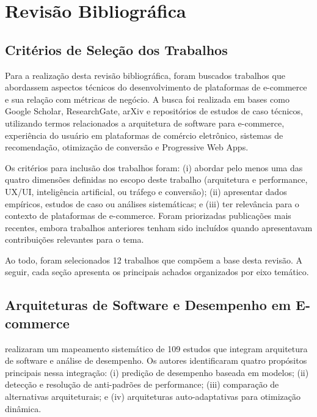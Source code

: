 \chapter{Revisão Bibliográfica}
\label{ch:revisao}

\section{Critérios de Seleção dos Trabalhos}

Para a realização desta revisão bibliográfica, foram buscados trabalhos que abordassem aspectos técnicos do desenvolvimento de plataformas de e-commerce e sua relação com métricas de negócio. A busca foi realizada em bases como Google Scholar, ResearchGate, arXiv e repositórios de estudos de caso técnicos, utilizando termos relacionados a arquitetura de software para e-commerce, experiência do usuário em plataformas de comércio eletrônico, sistemas de recomendação, otimização de conversão e Progressive Web Apps.

Os critérios para inclusão dos trabalhos foram: (i) abordar pelo menos uma das quatro dimensões definidas no escopo deste trabalho (arquitetura e performance, UX/UI, inteligência artificial, ou tráfego e conversão); (ii) apresentar dados empíricos, estudos de caso ou análises sistemáticas; e (iii) ter relevância para o contexto de plataformas de e-commerce. Foram priorizadas publicações mais recentes, embora trabalhos anteriores tenham sido incluídos quando apresentavam contribuições relevantes para o tema.

Ao todo, foram selecionados 12 trabalhos que compõem a base desta revisão. A seguir, cada seção apresenta os principais achados organizados por eixo temático.

\section{Arquiteturas de Software e Desempenho em E-commerce}

\cite{zhao_systematic_2024} realizaram um mapeamento sistemático de 109 estudos que integram arquitetura de software e análise de desempenho. Os autores identificaram quatro propósitos principais nessa integração: (i) predição de desempenho baseada em modelos; (ii) detecção e resolução de anti-padrões de performance; (iii) comparação de alternativas arquiteturais; e (iv) arquiteturas auto-adaptativas para otimização dinâmica.

